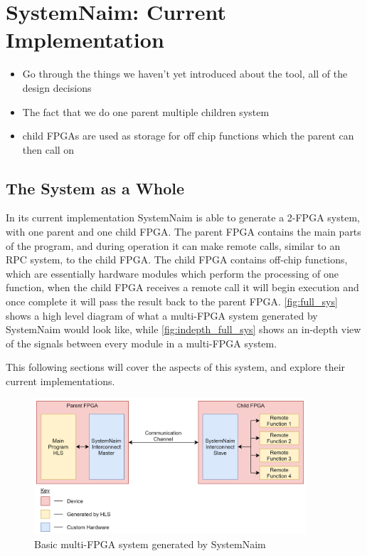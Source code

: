 \chapter{SystemNaim: Current Implementation}

\begin{itemize}
    \item Go through the things we haven't yet introduced about the tool, all of the design decisions
    \item The fact that we do one parent multiple children system
    \item child FPGAs are used as storage for off chip functions which the parent can then call on
\end{itemize}

\section{The System as a Whole}

In its current implementation SystemNaim is able to generate a 2-FPGA system, with one parent and one child FPGA. The parent FPGA contains the main parts of the program, and during operation it can make remote calls, similar to an RPC system, to the child FPGA. The child FPGA contains off-chip functions, which are essentially hardware modules which perform the processing of one function, when the child FPGA receives a remote call it will begin execution and once complete it will pass the result back to the parent FPGA. \autoref{fig:full_sys} shows a high level diagram of what a multi-FPGA system generated by SystemNaim would look like, while \autoref{fig:indepth_full_sys} shows an in-depth view of the signals between every module in a multi-FPGA system.

This following sections will cover the aspects of this system, and explore their current implementations.

\begin{figure}[!h]
    \centering
    \includegraphics[width=0.9\textwidth]{04_Implementation/images/full_system.png}
    \caption{Basic multi-FPGA system generated by SystemNaim}
    \label{fig:full_sys}
\end{figure}

